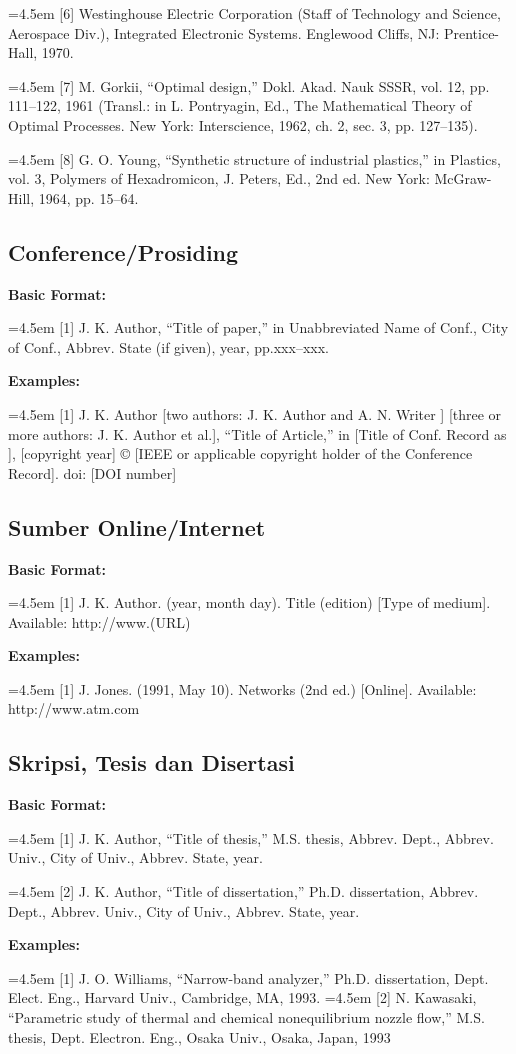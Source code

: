 \hangindent=4.5em 
[6] Westinghouse Electric Corporation (Staff of Technology and Science, Aerospace Div.), Integrated Electronic Systems. Englewood Cliffs, NJ: Prentice-Hall, 1970.

\hangindent=4.5em 
[7] M. Gorkii, ``Optimal design,'' Dokl. Akad. Nauk SSSR, vol. 12, pp. 111--122, 1961 (Transl.: in L. Pontryagin, Ed., The Mathematical Theory of Optimal Processes. New York: Interscience, 1962, ch. 2, sec. 3, pp. 127--135).

\hangindent=4.5em 
[8] G. O. Young, ``Synthetic structure of industrial plastics,'' in Plastics, vol. 3, Polymers of Hexadromicon, J. Peters, Ed., 2nd ed. New York: McGraw-Hill, 1964, pp. 15--64.

\subsection*{Conference/Prosiding}

\textbf{Basic Format:}

\hangindent=4.5em
[1] J. K. Author, ``Title of paper,'' in Unabbreviated Name of Conf., City of Conf., Abbrev. State (if given), year, pp.xxx--xxx.

\textbf{Examples:}

\hangindent=4.5em
[1] J. K. Author [two authors: J. K. Author and A. N. Writer ] [three or more authors: J. K. Author et al.], ``Title of Article,'' in [Title of Conf. Record as ], [copyright year] © [IEEE or applicable copyright holder of the Conference Record]. doi: [DOI number]

\subsection*{Sumber Online/Internet}

\textbf{Basic Format:}

\hangindent=4.5em
[1] J. K. Author. (year, month day). Title (edition) [Type of medium]. Available: http://www.(URL)

\textbf{Examples:}

\hangindent=4.5em
[1] J. Jones. (1991, May 10). Networks (2nd ed.) [Online]. Available: http://www.atm.com

\subsection*{Skripsi, Tesis dan Disertasi}

\textbf{Basic Format:}

\hangindent=4.5em
[1] J. K. Author, ``Title of thesis,'' M.S. thesis, Abbrev. Dept., Abbrev. Univ., City of Univ., Abbrev. State, year.

\hangindent=4.5em
[2] J. K. Author, ``Title of dissertation,'' Ph.D. dissertation, Abbrev. Dept., Abbrev. Univ., City of Univ., Abbrev. State, year.

\textbf{Examples:}

\hangindent=4.5em
[1] J. O. Williams, ``Narrow-band analyzer,'' Ph.D. dissertation, Dept. Elect. Eng., Harvard Univ., Cambridge, MA, 1993.
\hangindent=4.5em
[2] N. Kawasaki, ``Parametric study of thermal and chemical nonequilibrium nozzle flow,'' M.S. thesis, Dept. Electron. Eng., Osaka Univ., Osaka, Japan, 1993